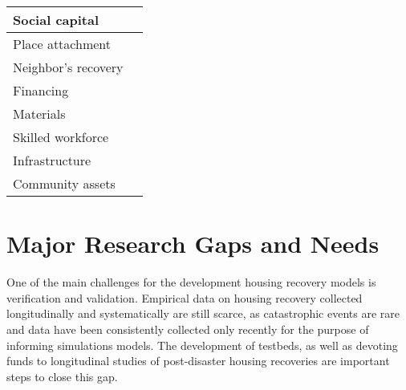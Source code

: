 \begin{table}[tbh]
\begin{tabularx}{\textwidth}{|l|X|}
    Social capital & \cite{airriess2008church, aldrich2010fixing, aldrich2011power, aldrich2012building, li2010katrina, burton2015validation, sadri2018role} \\ \midrule 
    
    Place attachment & \cite{chamlee2009there, cutter2010disaster, kick2011repetitive, binder2015rebuild, mcneil2015household, reid2015making} \\ \midrule
    
    Neighbor's recovery & \cite{dacy1969economics, rust2006financial, nejat2012agent} \\ \midrule 
    
    Financing & \cite{wu2004comparative, kamel2004residential, Nabil2004, comerio2014disaster, BankOfNZ2016, Nejat2016} \\ \midrule
    
    Materials & \cite{comerio2006estimating, REDi, bilau2015framework} \\ \midrule
    
    Skilled workforce & \cite{comerio2006estimating, chang2011identifying, boiser2011skills, bilau2015framework, hwang2015postdisaster, bothara2016challenges, REDi} \\ \midrule 
    
    Infrastructure & \cite{Miles2011, comerio2014disaster, burton2015validation, nejat2019anchors} \\ \midrule
    
    Community assets & \cite{Miles2011, comerio2014disaster, burton2015validation, nejat2019anchors} \\

    \bottomrule

    \end{tabularx}
    \label{tab:FactorsHousingRecovery}
\end{table}

\section{Major Research Gaps and Needs}

One of the main challenges for the development housing recovery models is verification and validation. Empirical data on housing recovery collected longitudinally and systematically are still scarce, as catastrophic events are rare and data have been consistently collected only recently  for the purpose of informing simulations models. The development of testbeds, as well as devoting funds to longitudinal studies of post-disaster housing recoveries are important steps to close this gap.\ 

